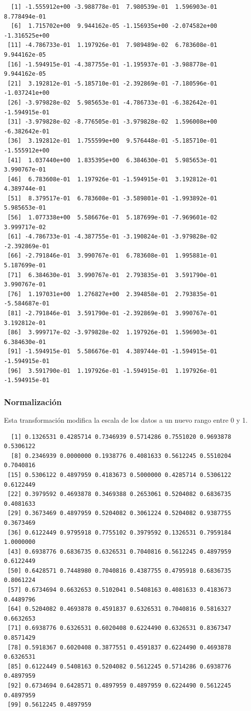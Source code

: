\documentclass[
  us-letterpaper,
]{scrreprt}
\theoremstyle{plain}
\theoremstyle{definition}
\theoremstyle{definition}
\theoremstyle{remark}
\begin{document}
\begin{verbatim}
  [1] -1.555912e+00 -3.988778e-01  7.980539e-01  1.596903e-01  8.778494e-01
  [6]  1.715702e+00  9.944162e-05 -1.156935e+00 -2.074582e+00 -1.316525e+00
 [11] -4.786733e-01  1.197926e-01  7.989489e-02  6.783608e-01  9.944162e-05
 [16] -1.594915e-01 -4.387755e-01 -1.195937e-01 -3.988778e-01  9.944162e-05
 [21]  3.192812e-01 -5.185710e-01 -2.392869e-01 -7.180596e-01 -1.037241e+00
 [26] -3.979828e-02  5.985653e-01 -4.786733e-01 -6.382642e-01 -1.594915e-01
 [31] -3.979828e-02 -8.776505e-01 -3.979828e-02  1.596008e+00 -6.382642e-01
 [36]  3.192812e-01  1.755599e+00  9.576448e-01 -5.185710e-01 -1.555912e+00
 [41]  1.037440e+00  1.835395e+00  6.384630e-01  5.985653e-01  3.990767e-01
 [46]  6.783608e-01  1.197926e-01 -1.594915e-01  3.192812e-01  4.389744e-01
 [51]  8.379517e-01  6.783608e-01 -3.589801e-01 -1.993892e-01  5.985653e-01
 [56]  1.077338e+00  5.586676e-01  5.187699e-01 -7.969601e-02  3.999717e-02
 [61] -4.786733e-01 -4.387755e-01 -3.190824e-01 -3.979828e-02 -2.392869e-01
 [66] -2.791846e-01  3.990767e-01  6.783608e-01  1.995881e-01  5.187699e-01
 [71]  6.384630e-01  3.990767e-01  2.793835e-01  3.591790e-01  3.990767e-01
 [76]  1.197031e+00  1.276827e+00  2.394858e-01  2.793835e-01 -5.584687e-01
 [81] -2.791846e-01  3.591790e-01 -2.392869e-01  3.990767e-01  3.192812e-01
 [86]  3.999717e-02 -3.979828e-02  1.197926e-01  1.596903e-01  6.384630e-01
 [91] -1.594915e-01  5.586676e-01  4.389744e-01 -1.594915e-01 -1.594915e-01
 [96]  3.591790e-01  1.197926e-01 -1.594915e-01  1.197926e-01 -1.594915e-01
\end{verbatim}

\subsubsection{Normalización}\label{normalizaciuxf3n-1}

Esta transformación modifica la escala de los datos a un nuevo rango
entre 0 y 1.

\begin{verbatim}
  [1] 0.1326531 0.4285714 0.7346939 0.5714286 0.7551020 0.9693878 0.5306122
  [8] 0.2346939 0.0000000 0.1938776 0.4081633 0.5612245 0.5510204 0.7040816
 [15] 0.5306122 0.4897959 0.4183673 0.5000000 0.4285714 0.5306122 0.6122449
 [22] 0.3979592 0.4693878 0.3469388 0.2653061 0.5204082 0.6836735 0.4081633
 [29] 0.3673469 0.4897959 0.5204082 0.3061224 0.5204082 0.9387755 0.3673469
 [36] 0.6122449 0.9795918 0.7755102 0.3979592 0.1326531 0.7959184 1.0000000
 [43] 0.6938776 0.6836735 0.6326531 0.7040816 0.5612245 0.4897959 0.6122449
 [50] 0.6428571 0.7448980 0.7040816 0.4387755 0.4795918 0.6836735 0.8061224
 [57] 0.6734694 0.6632653 0.5102041 0.5408163 0.4081633 0.4183673 0.4489796
 [64] 0.5204082 0.4693878 0.4591837 0.6326531 0.7040816 0.5816327 0.6632653
 [71] 0.6938776 0.6326531 0.6020408 0.6224490 0.6326531 0.8367347 0.8571429
 [78] 0.5918367 0.6020408 0.3877551 0.4591837 0.6224490 0.4693878 0.6326531
 [85] 0.6122449 0.5408163 0.5204082 0.5612245 0.5714286 0.6938776 0.4897959
 [92] 0.6734694 0.6428571 0.4897959 0.4897959 0.6224490 0.5612245 0.4897959
 [99] 0.5612245 0.4897959
\end{verbatim}
\end{document}
